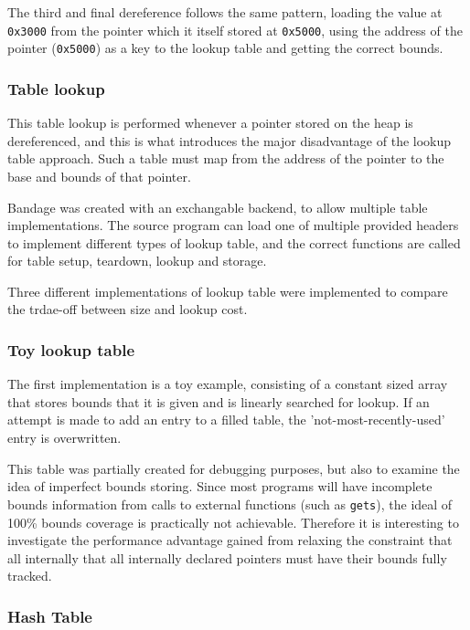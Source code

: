 The third and final dereference follows the same pattern, loading the value at \verb!0x3000! from the pointer which it itself stored at \verb!0x5000!, using the address of the pointer (\verb!0x5000!) as a key to the lookup table and getting the correct bounds.

\subsubsection{Table lookup}

This table lookup is performed whenever a pointer stored on the heap is dereferenced, and this is what introduces the major disadvantage of the lookup table approach.
Such a table must map from the address of the pointer to the base and bounds of that pointer.

Bandage was created with an exchangable backend, to allow multiple table implementations.
The source program can load one of multiple provided headers to implement different types of lookup table, and the correct functions are called for table setup, teardown, lookup and storage.

Three different implementations of lookup table were implemented to compare the trdae-off between size and lookup cost.

\subsubsection{Toy lookup table}

The first implementation is a toy example, consisting of a constant sized array that stores bounds that it is given and is linearly searched for lookup.
If an attempt is made to add an entry to a filled table, the 'not-most-recently-used' entry is overwritten.

This table was partially created for debugging purposes, but also to examine the idea of imperfect bounds storing.
Since most programs will have incomplete bounds information from calls to external functions (such as \verb!gets!), the ideal of 100\% bounds coverage is practically not achievable.
Therefore it is interesting to investigate the performance advantage gained from relaxing the constraint that all internally that all internally declared pointers must have their bounds fully tracked.

\subsubsection{Hash Table}

